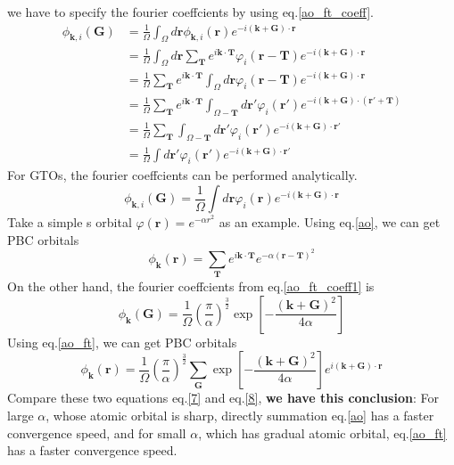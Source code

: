 \documentclass{article}
\begin{document}
    we have to specify the fourier coeffcients by using eq.\eqref{ao_ft_coeff}.
    \begin{align*}
        \phi_{\textbf{k},i}(\textbf{G}) &= \frac{1}{\Omega}\int_\Omega d\textbf{r}\phi_{\textbf{k},i}(\textbf{r})e^{-i(\textbf{k}+\textbf{G})\cdot\textbf{r}}\\
        &= \frac{1}{\Omega}\int_\Omega d\textbf{r}\sum_{\textbf{T}}e^{i\textbf{k}\cdot\textbf{T}}\varphi_i(\textbf{r}-\textbf{T})e^{-i(\textbf{k}+\textbf{G})\cdot\textbf{r}}\\
        &= \frac{1}{\Omega}\sum_{\textbf{T}}e^{i\textbf{k}\cdot\textbf{T}}\int_\Omega d\textbf{r}\varphi_i(\textbf{r}-\textbf{T})e^{-i(\textbf{k}+\textbf{G})\cdot\textbf{r}}\\
        &= \frac{1}{\Omega}\sum_{\textbf{T}}e^{i\textbf{k}\cdot\textbf{T}}\int_{\Omega-\textbf{T}} d\textbf{r}'\varphi_i(\textbf{r}')e^{-i(\textbf{k}+\textbf{G})\cdot(\textbf{r}'+\textbf{T})}\\
        &= \frac{1}{\Omega}\sum_{\textbf{T}}\int_{\Omega-\textbf{T}} d\textbf{r}'\varphi_i(\textbf{r}')e^{-i(\textbf{k}+\textbf{G})\cdot\textbf{r}'}\\
        &= \frac{1}{\Omega}\int d\textbf{r}'\varphi_i(\textbf{r}')e^{-i(\textbf{k}+\textbf{G})\cdot\textbf{r}'}
    \end{align*}
    For GTOs, the fourier coeffcients can be performed analytically.
    \begin{equation}
        \phi_{\textbf{k},i}(\textbf{G}) = \frac{1}{\Omega}\int d\textbf{r}\varphi_i(\textbf{r})e^{-i(\textbf{k}+\textbf{G})\cdot\textbf{r}}\label{ao_ft_coeff1}
    \end{equation}
    Take a simple s orbital $\varphi(\textbf{r})=e^{-\alpha r^2}$ as an example.
    Using eq.\eqref{ao}, we can get PBC orbitals
    \begin{equation}
        \phi_{\textbf{k}}(\textbf{r}) = \sum_{\textbf{T}}e^{i\textbf{k}\cdot\textbf{T}}e^{-\alpha (\textbf{r}-\textbf{T})^2}\label{7}
    \end{equation}
    On the other hand, the fourier coeffcients from eq.\eqref{ao_ft_coeff1} is
    \begin{equation*}
        \phi_{\textbf{k}}(\textbf{G}) = \frac{1}{\Omega}\left(\frac{\pi}{\alpha}\right)^{\frac{3}{2}}\exp\left[-\frac{(\textbf{k}+\textbf{G})^2}{4\alpha}\right]
    \end{equation*}
    Using eq.\eqref{ao_ft}, we can get PBC orbitals
    \begin{equation}
        \phi_{\textbf{k}}(\textbf{r}) = \frac{1}{\Omega}\left(\frac{\pi}{\alpha}\right)^{\frac{3}{2}}\sum_{\textbf{G}}\exp\left[-\frac{(\textbf{k}+\textbf{G})^2}{4\alpha}\right]e^{i(\textbf{k}+\textbf{G})\cdot\textbf{r}}\label{8}
    \end{equation}
    Compare these two equations eq.\eqref{7} and eq.\eqref{8}, \textbf{we have this conclusion}:
    For large $\alpha$, whose atomic orbital is sharp, directly summation eq.\eqref{ao} has a faster convergence speed,
    and for small $\alpha$, which has gradual atomic orbital, eq.\eqref{ao_ft} has a faster convergence speed.
    
\end{document}

